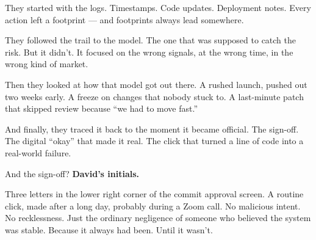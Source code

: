 They started with the logs.
Timestamps. Code updates. Deployment notes.
Every action left a footprint — and footprints always lead somewhere.

They followed the trail to the model.
The one that was supposed to catch the risk.
But it didn’t.
It focused on the wrong signals, at the wrong time, in the wrong kind of market.

Then they looked at how that model got out there.
A rushed launch, pushed out two weeks early.
A freeze on changes that nobody stuck to.
A last-minute patch that skipped review because “we had to move fast.”

And finally, they traced it back to the moment it became official.
The sign-off.
The digital “okay” that made it real.
The click that turned a line of code into a real-world failure.

And the sign-off?  \textbf{David’s initials.}

Three letters in the lower right corner of the commit approval screen.
A routine click, made after a long day, probably during a Zoom call.
No malicious intent. No recklessness.
Just the ordinary negligence of someone who believed the system was stable.
Because it always had been.  Until it wasn’t.

\medskip

